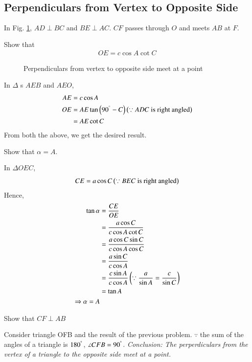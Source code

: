 \subsection{Perpendiculars from Vertex to Opposite Side}
	In Fig. \ref{ch3_perp_triang}, $AD \perp BC$ and $BE \perp AC$. $CF$ passes through $O$ and meets
	$AB$ at $F$.  	
\begin{problem}
	Show that 
	\begin{align}
	OE = c \cos A \cot C
	\end{align}
\end{problem}
	\begin{figure}[!h]
		\begin{center}
			
			\resizebox{\columnwidth}{!}{}
		\end{center}
		\caption{Perpendiculars from vertex to opposite side meet at a point}
		\label{ch3_perp_triang}	
	\end{figure}
%
\proof In $\Delta$ s $AEB$ and $AEO$,
%
\begin{align}
AE &= c \cos A \\
OE &= AE \tan \left(90^{\degree} - C\right) \left(\because ADC \text{ is right angled}\right) \\
&= AE \cot C
\end{align}
%
From both the above, we get the desired result.
%
\begin{problem}
	Show that $\alpha = A$.
\end{problem}
\proof In $\Delta OEC$,
%
\begin{equation}
CE = a \cos C \left(\because BEC \text{ is right angled}\right)
\end{equation}
%
Hence,
%
\begin{equation}
\begin{split}
\tan \alpha &= \frac{CE}{OE} \\
&=  \frac{a \cos C}{c \cos A \cot C} \\
&=  \frac{a \cos C \sin C}{c \cos A \cos C} \\
&= \frac{a \sin C}{c \cos A } \\
&= \frac{c \sin A}{c \cos A } \left(\because \frac{a}{\sin A} = \frac{c}{\sin C}\right)\\
&= \tan A\\
\Rightarrow \alpha = A
\end{split}
\end{equation}
%
\begin{problem}
	Show that $CF \perp AB$
\end{problem}
\proof Consider triangle OFB and the result of the previous problem.  $\because$ the sum of the angles of a triangle is $180^{\degree}$, $\angle CFB = 90^{\degree}$.
{\em Conclusion: The perperdiculars from the vertex of a triangle to the opposite side meet at a point.}